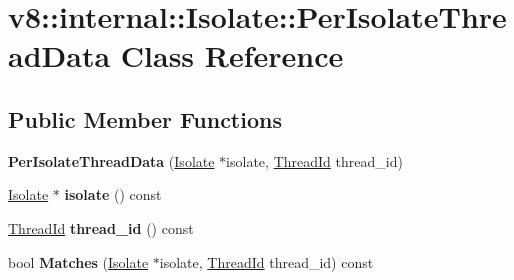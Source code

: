 \hypertarget{classv8_1_1internal_1_1_isolate_1_1_per_isolate_thread_data}{}\section{v8\+:\+:internal\+:\+:Isolate\+:\+:Per\+Isolate\+Thread\+Data Class Reference}
\label{classv8_1_1internal_1_1_isolate_1_1_per_isolate_thread_data}
\subsection*{Public Member Functions}
\begin{DoxyCompactItemize}
\item 
\hypertarget{classv8_1_1internal_1_1_isolate_1_1_per_isolate_thread_data_ac7375d147bcf918363e02932ab036b98}{}{\bfseries Per\+Isolate\+Thread\+Data} (\hyperlink{classv8_1_1internal_1_1_isolate}{Isolate} $\ast$isolate, \hyperlink{classv8_1_1internal_1_1_thread_id}{Thread\+Id} thread\+\_\+id)\label{classv8_1_1internal_1_1_isolate_1_1_per_isolate_thread_data_ac7375d147bcf918363e02932ab036b98}

\item 
\hypertarget{classv8_1_1internal_1_1_isolate_1_1_per_isolate_thread_data_aa6864a4f2821eefca8e3aad845d2beb2}{}\hyperlink{classv8_1_1internal_1_1_isolate}{Isolate} $\ast$ {\bfseries isolate} () const \label{classv8_1_1internal_1_1_isolate_1_1_per_isolate_thread_data_aa6864a4f2821eefca8e3aad845d2beb2}

\item 
\hypertarget{classv8_1_1internal_1_1_isolate_1_1_per_isolate_thread_data_a0a6a459da5f4810865cfa71d85ee18ef}{}\hyperlink{classv8_1_1internal_1_1_thread_id}{Thread\+Id} {\bfseries thread\+\_\+id} () const \label{classv8_1_1internal_1_1_isolate_1_1_per_isolate_thread_data_a0a6a459da5f4810865cfa71d85ee18ef}

\item 
\hypertarget{classv8_1_1internal_1_1_isolate_1_1_per_isolate_thread_data_aa6d416451308983f1955bb40eed14867}{}bool {\bfseries Matches} (\hyperlink{classv8_1_1internal_1_1_isolate}{Isolate} $\ast$isolate, \hyperlink{classv8_1_1internal_1_1_thread_id}{Thread\+Id} thread\+\_\+id) const \label{classv8_1_1internal_1_1_isolate_1_1_per_isolate_thread_data_aa6d416451308983f1955bb40eed14867}

\end{DoxyCompactItemize}
